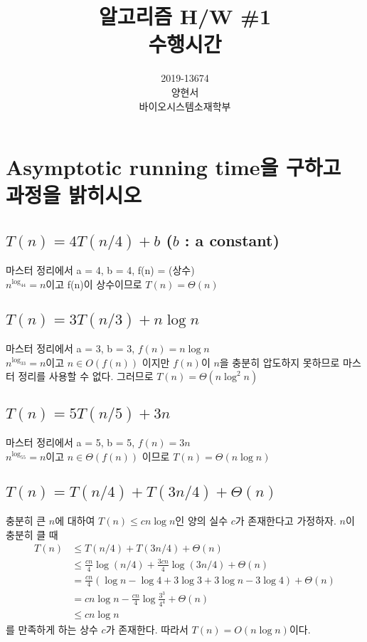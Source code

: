 \documentclass{article}
\title{알고리즘 H/W \#1 \\
\large 수행시간}
\date{}
\author{
  2019-13674\\
  양현서 \\
  바이오시스템소재학부\\
}
\begin{document}
\maketitle


\section{Asymptotic running time을 구하고 과정을 밝히시오}

\subsection{$T(n) = 4T(n/4)+ b$  ($b$ : a constant)}
마스터 정리에서 a = 4, b = 4, f(n) = (상수) \\
$n^{\log_44} = n$이고 f(n)이 상수이므로
$T(n) = \Theta(n)$

\subsection{$T(n) = 3T(n/3)+ n \log n$}
마스터 정리에서 a = 3, b = 3, $f(n) = n \log n$ \\
$n^{\log_33} = n$이고 $n \in O(f(n))$ 이지만 $f(n)$이 $n$을 충분히 압도하지 못하므로 마스터 정리를 사용할 수 없다. 그러므로 $T(n) = \Theta(n \log^2 n)$

\subsection{$T(n) = 5T(n/5)+ 3n$}
마스터 정리에서 a = 5, b = 5, $f(n) = 3n$ \\
$n^{\log_55} = n$이고 $n \in \Theta(f(n))$ 이므로
$T(n) = \Theta(n \log n)$

\subsection{$T(n) = T(n/4) + T(3n/4) + \Theta(n)$}
충분히 큰 $n$에 대하여 $T(n) \le cn\log n$인 양의 실수 $c$가 존재한다고 가정하자. $n$이 충분히 클 때
\begin{align*}
    T(n) &\le T(n/4) + T(3n/4) + \Theta(n) \\
         &\le \frac{cn}{4}\log(n/4) + \frac{3cn}{4}\log(3n/4) + \Theta(n) \\
         &=\frac{cn}{4}(\log n- \log 4 + 3 \log 3 + 3 \log n - 3\log 4)+ \Theta(n) \\
         &=cn\log n - \frac{cn}{4} \log \frac{3^3}{4^4} + \Theta(n) \\
         &\le cn \log n 
\end{align*}
를 만족하게 하는 상수 $c$가 존재한다. 따라서 $T(n) = O(n\log n)$이다.
\end{document}
